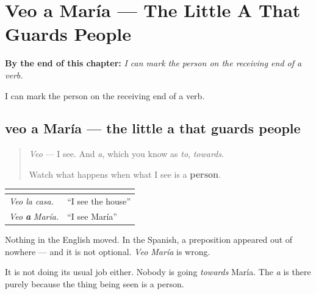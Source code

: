 
\chapter{Veo a María --- The Little A That Guards People}
\label{ch:veo-a-maria}

\begin{chapteropening}
\textbf{By the end of this chapter:} \emph{I can mark the person on the receiving end of a verb.}

I can mark the person on the receiving end of a verb.
\end{chapteropening}

\section[veo a María]{veo a María — the little a that guards people}

\label{lesson:ES-C62-veo-a-maria}



\begin{quote}
\emph{Veo} — I see. And \emph{a}, which you know as \emph{to}, \emph{towards}.

Watch what happens when what I see is a \textbf{person}.
\end{quote}

\begin{grammarlens}[title={Grammar Lens: it appears, then vanishes}]
\noindent
\begin{tabularx}{\linewidth}{@{}>{\raggedright\arraybackslash}X>{\raggedright\arraybackslash}X@{}}
\toprule
\textbf{} & \textbf{} \\
\midrule
\emph{Veo la casa.} & \textquotedblleft{}I see the house\textquotedblright{} \\
\emph{Veo} \emph{\textbf{a}} \emph{María.} & \textquotedblleft{}I see María\textquotedblright{} \\
\bottomrule
\end{tabularx}

Nothing in the English moved. In the Spanish, a preposition appeared out of nowhere — and it is not optional. \emph{Veo María} is wrong.

It is not doing its usual job either. Nobody is going \emph{towards} María. The \emph{a} is there purely because the thing being seen is a person.
\end{grammarlens}

